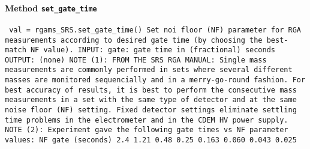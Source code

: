 \paragraph{Method \texttt{set_gate_time}}
\vspace{1ex}
\texttt{\newline
val = rgams_SRS.set_gate_time()\newline
\newline
Set noi floor (NF) parameter for RGA measurements according to desired gate time (by choosing the best-match NF value).\newline
\newline
INPUT:\newline
gate: gate time in (fractional) seconds\newline
\newline
OUTPUT:\newline
(none)\newline
\newline
NOTE (1):\newline
FROM THE SRS RGA MANUAL:\newline
Single mass measurements are commonly performed in sets\newline
where several different masses are monitored sequencially\newline
and in a merry-go-round fashion.\newline
For best accuracy of results, it is best to perform the consecutive\newline
mass measurements in a set with the same type of detector\newline
and at the same noise floor (NF) setting.\newline
Fixed detector settings eliminate settling time problems\newline
in the electrometer and in the CDEM HV power supply.\newline
\newline
NOTE (2):\newline
Experiment gave the following gate times vs NF parameter values:\newline
\newline
NF	gate (seconds)	2.4	  	1.21	  	0.48	  	0.25	  	0.163 	0.060 	0.043 	0.025 \newline
\newline
}

